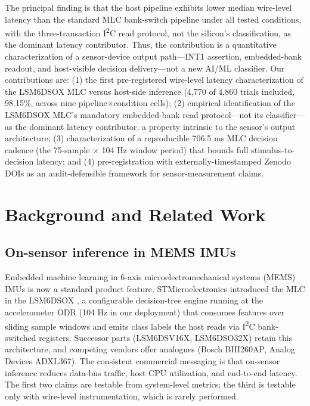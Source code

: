 The principal finding is that the host pipeline exhibits lower median wire-level latency than the standard MLC bank-switch pipeline under all tested conditions, with the three-transaction I\textsuperscript{2}C read protocol, not the silicon's classification, as the dominant latency contributor. Thus, the contribution is a quantitative characterization of a sensor-device output path---INT1 assertion, embedded-bank readout, and host-visible decision delivery---not a new AI/ML classifier. Our contributions are: (1) the first pre-registered wire-level latency characterization of the LSM6DSOX MLC versus host-side inference (4,770 of 4,860 trials included, 98.15\%, across nine pipeline$\times$condition cells); (2) empirical identification of the LSM6DSOX MLC's mandatory embedded-bank read protocol---not its classifier---as the dominant latency contributor, a property intrinsic to the sensor's output architecture; (3) characterization of a reproducible 706.5 ms MLC decision cadence (the 75-sample $\times$ 104 Hz window period) that bounds full stimulus-to-decision latency; and (4) pre-registration with externally-timestamped Zenodo DOIs as an audit-defensible framework for sensor-measurement claims.


\section{Background and Related Work}

\subsection{On-sensor inference in MEMS IMUs}

Embedded machine learning in 6-axis microelectromechanical systems (MEMS) IMUs is now a standard product feature. STMicroelectronics introduced the MLC in the LSM6DSOX \cite{ref2}, a configurable decision-tree engine running at the accelerometer ODR (104 Hz in our deployment) that consumes features over sliding sample windows and emits class labels the host reads via I\textsuperscript{2}C bank-switched registers. Successor parts (LSM6DSV16X, LSM6DSO32X) retain this architecture, and competing vendors offer analogues (Bosch BHI260AP, Analog Devices ADXL367). The consistent commercial messaging is that on-sensor inference reduces data-bus traffic, host CPU utilization, and end-to-end latency. The first two claims are testable from system-level metrics; the third is testable only with wire-level instrumentation, which is rarely performed.

